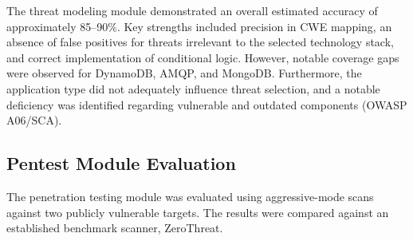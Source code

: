 \documentclass[12pt, a4paper]{article}
\begin{document}
The threat modeling module demonstrated an overall estimated accuracy of approximately 85--90\%. Key strengths included precision in CWE mapping, an absence of false positives for threats irrelevant to the selected technology stack, and correct implementation of conditional logic. However, notable coverage gaps were observed for DynamoDB, AMQP, and MongoDB. Furthermore, the application type did not adequately influence threat selection, and a notable deficiency was identified regarding vulnerable and outdated components (OWASP A06/SCA).

\subsection{Pentest Module Evaluation}

The penetration testing module was evaluated using aggressive-mode scans against two publicly vulnerable targets. The results were compared against an established benchmark scanner, ZeroThreat.

\begin{table}[H]
\centering
\caption{Pentest Test 1 --- Target: juiceshop.zerothreat.ai/juiceshop}
\label{tab:pt_test1}
\small
\renewcommand{\arraystretch}{1.3}
\end{table}
\end{document}
